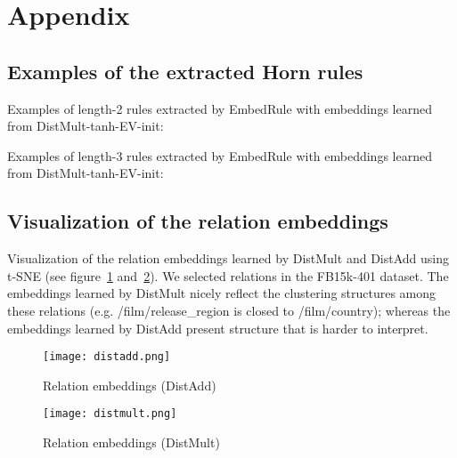 \documentclass{article} \usepackage{iclr2015,times}
\begin{document}
\section*{Appendix}
\renewcommand{\thesubsection}{\Alph{subsection}}

\subsection{Examples of the extracted Horn rules}
Examples of length-2 rules extracted by {\sc EmbedRule} with embeddings learned from {\sc DistMult}-tanh-EV-init:






Examples of length-3 rules extracted by {\sc EmbedRule} with embeddings learned from {\sc DistMult}-tanh-EV-init:




\subsection{Visualization of the relation embeddings}
Visualization of the relation embeddings learned by {\sc DistMult} and {\sc DistAdd} using t-SNE (see figure~\ref{fig:distadd} and~\ref{fig:distmult}). We selected  relations in the FB15k-401 dataset. The embeddings learned by {\sc DistMult} nicely reflect the clustering structures among these relations (e.g. /film/release\_region is closed to /film/country); whereas the embeddings learned by {\sc DistAdd} present structure that is harder to interpret. 

\begin{figure}[ht]
\centering
\texttt{[image: distadd.png]}
\caption{Relation embeddings ({\sc DistAdd})}
\label{fig:distadd}
\end{figure}

\begin{figure}[ht]
\centering
\texttt{[image: distmult.png]}
\caption{Relation embeddings ({\sc DistMult})}
\label{fig:distmult}
\end{figure}





\end{document}
